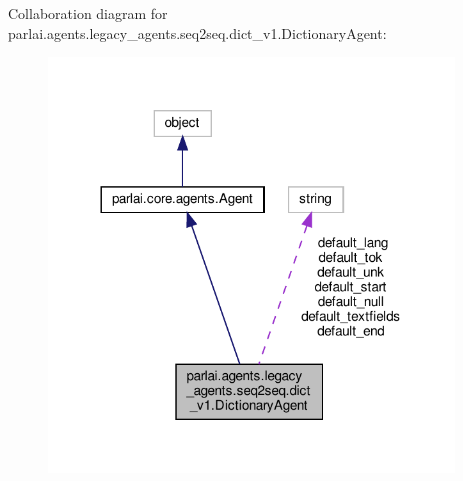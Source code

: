Collaboration diagram for parlai.\+agents.\+legacy\+\_\+agents.\+seq2seq.\+dict\+\_\+v1.\+Dictionary\+Agent\+:
\nopagebreak
\begin{figure}[H]
\begin{center}
\leavevmode
\includegraphics[width=305pt]{classparlai_1_1agents_1_1legacy__agents_1_1seq2seq_1_1dict__v1_1_1DictionaryAgent__coll__graph}
\end{center}
\end{figure}
